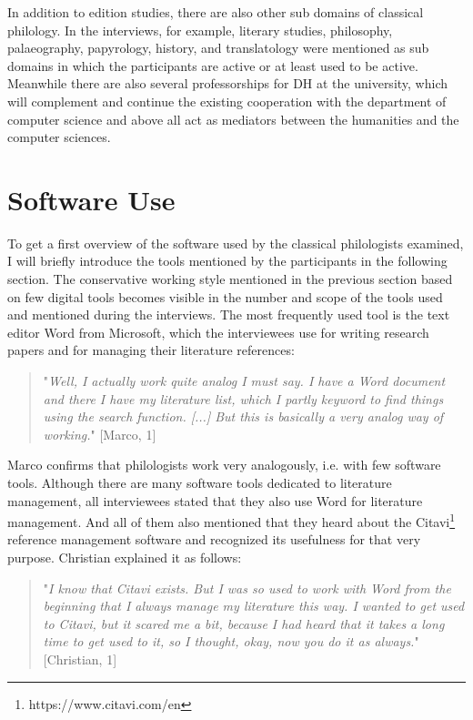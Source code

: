 \documentclass[12pt, a4paper, titlepage, oneside, abstract=true, toc=listof, toc=bibliography]{scrreprt}
\begin{document}
In addition to edition studies, there are also other sub domains of classical philology. In the interviews, for example, literary studies, philosophy, palaeography, papyrology, history, and translatology were mentioned as sub domains in which the participants are active or at least used to be active. Meanwhile there are also several professorships for \gls{DH} at the university, which will complement and continue the existing cooperation with the department of computer science and above all act as mediators between the humanities and the computer sciences. 

\section{Software Use}
\label{SW_use}
To get a first overview of the software used by the classical philologists examined, I will briefly introduce the tools mentioned by the participants in the following section.
The conservative working style mentioned in the previous section based on few digital tools becomes visible in the number and scope of the tools used and mentioned during the interviews. The most frequently used tool is the text editor \gls{Word} from Microsoft, which the interviewees use for writing research papers and for managing their literature references:

\begin{quotation}
"\textit{Well, I actually work quite analog I must say. I have a Word document and there I have my literature list, which I partly keyword to find things using the search function. [...] But this is basically a very analog way of working.}" [Marco, 1]
\end{quotation}

Marco confirms that philologists work very analogously, i.e. with few software tools. Although there are many software tools dedicated to literature management, all interviewees stated that they also use Word for literature management. And all of them also mentioned that they heard about the \gls{Citavi}\footnote{https://www.citavi.com/en} reference management software and recognized its usefulness for that very purpose. Christian explained it as follows:

\begin{quotation}
"\textit{I know that Citavi exists. But I was so used to work with Word from the beginning that I always manage my literature this way. I wanted to get used to Citavi, but it scared me a bit, because I had heard that it takes a long time to get used to it, so I thought, okay, now you do it as always.}" [Christian, 1]
\end{quotation}
 
\end{document}
